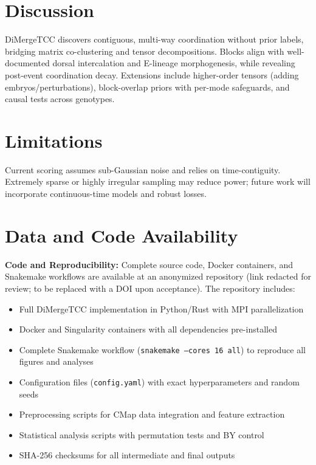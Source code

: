 \documentclass[unnumsec,webpdf,modern,large,namedate]{oup-authoring-template}%
\theoremstyle{thmstyleone}\newtheorem{theorem}{Theorem}
\theoremstyle{thmstyletwo}\newtheorem{example}{Example}
\theoremstyle{thmstylethree}\newtheorem{definition}{Definition}
\begin{document}
\section{Discussion}\label{sec:discussion}
DiMergeTCC discovers contiguous, multi-way coordination without prior labels, bridging matrix co-clustering and tensor decompositions. Blocks align with well-documented dorsal intercalation and E-lineage morphogenesis, while revealing post-event coordination decay. Extensions include higher-order tensors (adding embryos/perturbations), block-overlap priors with per-mode safeguards, and causal tests across genotypes.

\section{Limitations}\label{sec:limits}
Current scoring assumes sub-Gaussian noise and relies on time-contiguity. Extremely sparse or highly irregular sampling may reduce power; future work will incorporate continuous-time models and robust losses.

\section{Data and Code Availability}\label{sec:availability}

\textbf{Code and Reproducibility:} Complete source code, Docker containers, and Snakemake workflows are available at an anonymized repository (link redacted for review; to be replaced with a DOI upon acceptance). The repository includes:
\begin{itemize}
    \item Full DiMergeTCC implementation in Python/Rust with MPI parallelization
    \item Docker and Singularity containers with all dependencies pre-installed
    \item Complete Snakemake workflow (\texttt{snakemake --cores 16 all}) to reproduce all figures and analyses
    \item Configuration files (\texttt{config.yaml}) with exact hyperparameters and random seeds
    \item Preprocessing scripts for CMap data integration and feature extraction
    \item Statistical analysis scripts with permutation tests and BY control
    \item SHA-256 checksums for all intermediate and final outputs
\end{itemize}
\end{document}
